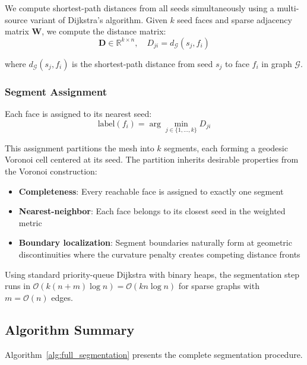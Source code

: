 We compute shortest-path distances from all seeds simultaneously using a multi-source variant of Dijkstra's algorithm. Given $k$ seed faces and sparse adjacency matrix $\mathbf{W}$, we compute the distance matrix:
\begin{equation}
    \mathbf{D} \in \mathbb{R}^{k \times n}, \quad D_{ji} = d_{\mathcal{G}}(s_j, f_i)
\end{equation}

where $d_{\mathcal{G}}(s_j, f_i)$ is the shortest-path distance from seed $s_j$ to face $f_i$ in graph $\mathcal{G}$.

\subsubsection{Segment Assignment}

Each face is assigned to its nearest seed:
\begin{equation}
    \text{label}(f_i) = \arg\min_{j \in \{1, \ldots, k\}} D_{ji}
\end{equation}

This assignment partitions the mesh into $k$ segments, each forming a geodesic Voronoi cell centered at its seed. The partition inherits desirable properties from the Voronoi construction:
\begin{itemize}
    \item \textbf{Completeness}: Every reachable face is assigned to exactly one segment
    \item \textbf{Nearest-neighbor}: Each face belongs to its closest seed in the weighted metric
    \item \textbf{Boundary localization}: Segment boundaries naturally form at geometric discontinuities where the curvature penalty creates competing distance fronts
\end{itemize}

Using standard priority-queue Dijkstra with binary heaps, the segmentation step runs in $\mathcal{O}(k(n + m)\log n) = \mathcal{O}(kn \log n)$ for sparse graphs with $m = \mathcal{O}(n)$ edges.

\subsection{Algorithm Summary}

Algorithm~\ref{alg:full_segmentation} presents the complete segmentation procedure.

